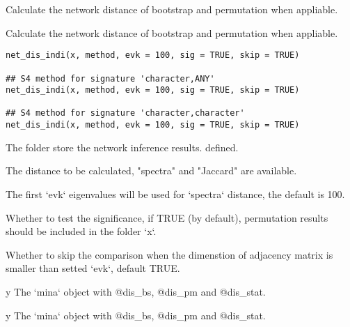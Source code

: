 \documentclass[a4paper]{book}
\begin{document}
%
\begin{Description}\relax
Calculate the network distance of bootstrap and permutation when appliable.

Calculate the network distance of bootstrap and permutation when appliable.
\end{Description}
%
\begin{Usage}
\begin{verbatim}
net_dis_indi(x, method, evk = 100, sig = TRUE, skip = TRUE)

## S4 method for signature 'character,ANY'
net_dis_indi(x, method, evk = 100, sig = TRUE, skip = TRUE)

## S4 method for signature 'character,character'
net_dis_indi(x, method, evk = 100, sig = TRUE, skip = TRUE)
\end{verbatim}
\end{Usage}
%
\begin{Arguments}
\begin{ldescription}
\item[\code{x}] The folder store the network inference results.
defined.

\item[\code{method}] The distance to be calculated, "spectra" and "Jaccard" are
available.

\item[\code{evk}] The first `evk` eigenvalues will be used for `spectra` distance,
the default is 100.

\item[\code{sig}] Whether to test the significance, if TRUE (by default),
permutation results should be included in the folder `x`.

\item[\code{skip}] Whether to skip the comparison when the dimenstion of adjacency
matrix is smaller than setted `evk`, default TRUE.
\end{ldescription}
\end{Arguments}
%
\begin{Value}
y The `mina` object with @dis\_bs, @dis\_pm and @dis\_stat.

y The `mina` object with @dis\_bs, @dis\_pm and @dis\_stat.
\end{Value}
\end{document}
